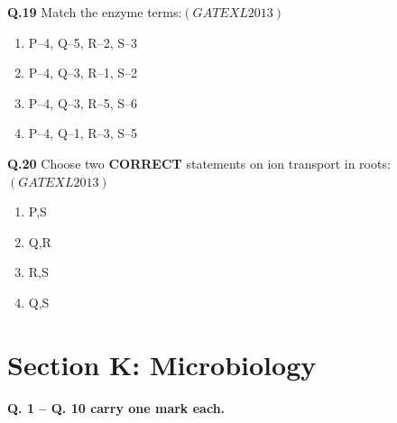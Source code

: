 \documentclass[12pt]{article}
\theoremstyle{remark}
\providecommand{\brak}[1]{\ensuremath{\left(#1\right)}}
\begin{document}
\textbf{Q.19} Match the enzyme terms:\hfill  \textit{\brak{GATE XL 2013}}
\begin{enumerate}
    \item P–4, Q–5, R–2, S–3
    \item P–4, Q–3, R–1, S–2
    \item P–4, Q–3, R–5, S–6
    \item P–4, Q–1, R–3, S–5
\end{enumerate}

\textbf{Q.20} Choose two \textbf{CORRECT} statements on ion transport in roots:\hfill  \textit{\brak{GATE XL 2013}}
\begin{enumerate}
    \item P,S
    \item Q,R
    \item R,S
    \item Q,S
\end{enumerate}

\clearpage
\section*{Section K: Microbiology}

\noindent\textbf{Q. 1 – Q. 10 carry one mark each.}
\end{document}
